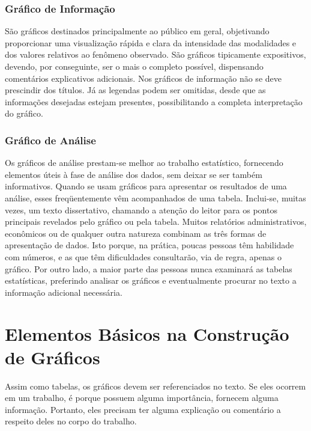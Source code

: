 \subsubsection{Gráfico de Informação}

São gráficos destinados principalmente ao público em geral, objetivando proporcionar uma visualização rápida e clara da intensidade das modalidades e dos valores relativos ao fenômeno observado. São gráficos tipicamente expositivos, devendo, por conseguinte, ser o mais o completo possível, dispensando comentários explicativos adicionais. Nos gráficos de informação não se deve prescindir dos títulos. Já as legendas podem ser omitidas, desde que as informações desejadas  estejam presentes, possibilitando a completa interpretação do gráfico.


\newpage
\subsubsection{Gráfico de Análise}

Os gráficos de análise prestam-se melhor ao trabalho estatístico, fornecendo elementos úteis à fase de análise dos dados, sem deixar se ser também informativos. Quando se usam gráficos para apresentar os resultados de uma análise, esses freqüentemente vêm acompanhados de uma tabela. Inclui-se, muitas vezes, um texto dissertativo, chamando a atenção do leitor para os pontos principais revelados pelo gráfico ou pela tabela. Muitos relatórios administrativos, econômicos ou de qualquer outra natureza combinam as três formas de apresentação de dados. Isto porque, na prática, poucas pessoas têm habilidade com números, e as que têm dificuldades consultarão, via de regra, apenas o gráfico. Por outro lado, a maior parte das pessoas nunca examinará as tabelas estatísticas, preferindo analisar os gráficos e eventualmente procurar no texto a informação adicional necessária.\vskip0.3cm



\section{Elementos  Básicos na Construção de Gráficos}

Assim como tabelas, os gráficos devem ser referenciados no texto. Se eles ocorrem em um trabalho, é porque possuem alguma importância, fornecem alguma informação. Portanto, eles precisam ter alguma explicação ou comentário a respeito deles no corpo do trabalho.\vskip0.3cm 


